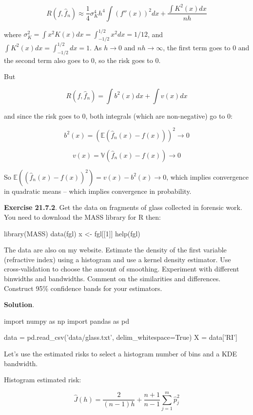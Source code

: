 \[ R(f, \hat{f}_n) \approx \frac{1}{4} \sigma_K^4 h^4 \int (f''(x))^2 dx + \frac{\int K^2(x)dx}{nh} \]

where
\(\sigma_K^2 = \int x^2 K(x) dx = \int_{-1/2}^{1/2} x^2 dx = 1/12\), and
\(\int K^2(x) dx = \int_{-1/2}^{1/2} dx = 1\). As \(h \rightarrow 0\)
and \(nh \rightarrow \infty\), the first term goes to 0 and the second
term also goes to 0, so the risk goes to 0.

But

\[ R(f, \hat{f}_n) = \int b^2(x) dx + \int v(x) dx \]

and since the risk goes to 0, both integrals (which are non-negative) go
to 0:

\[ b^2(x) = (\mathbb{E}(\hat{f}_n(x) - f(x)))^2 \rightarrow 0\]

\[ v(x) = \mathbb{V}(\hat{f}_n(x) - f(x)) \rightarrow 0\]

So
\(\mathbb{E}((\hat{f}_n(x) - f(x))^2) = v(x) - b^2(x) \rightarrow 0\),
which implies convergence in quadratic means -- which implies
convergence in probability.

\textbf{Exercise 21.7.2}. Get the data on fragments of glass collected
in forensic work. You need to download the MASS library for R then:

\begin{console}
library(MASS)
data(fgl)
x <- fgl[[1]]
help(fgl)
\end{console}

The data are also on my website. Estimate the density of the first
variable (refractive index) using a histogram and use a kernel density
estimator. Use cross-validation to choose the amount of smoothing.
Experiment with different binwidths and bandwidths. Comment on the
similarities and differences. Construct 95\% confidence bands for your
estimators.

\textbf{Solution}.

\begin{python}
import numpy as np
import pandas as pd

data = pd.read_csv('data/glass.txt', delim_whitespace=True)
X = data['RI']
\end{python}

Let's use the estimated risks to select a histogram number of bins and a
KDE bandwidth.

Histogram estimated risk:

\[ \hat{J}(h) = \frac{2}{(n - 1)h} + \frac{n+1}{n-1} \sum_{j=1}^m \hat{p}_j^2 \]

